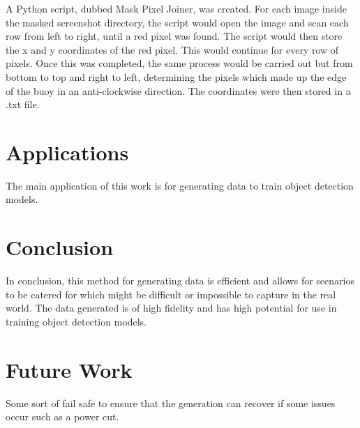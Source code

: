 \documentclass[10pt,twocolumn,letterpaper]{article}
\begin{document}
A Python script, dubbed Mask Pixel Joiner, was created. For each image inside the masked screenshot directory, the script would open the image and scan each row from left to right, until a red pixel was found. The script would then store the x and y coordinates of the red pixel. This would continue for every row of pixels. Once this was completed, the same process would be carried out but from bottom to top and right to left, determining the pixels which made up the edge of the buoy in an anti-clockwise direction. The coordinates were then stored in a .txt file.


\section{Applications}

The main application of this work is for generating data to train object detection models. 

\section{Conclusion}

In conclusion, this method for generating data is efficient and allows for scenarios to be catered for which might be difficult or impossible to capture in the real world. The data generated is of high fidelity and has high potential for use in training object detection models.

\section{Future Work}

Some sort of fail safe to ensure that the generation can recover if some issues occur such as a power cut.

{
    \small
    
    
}

% 
\end{document}
